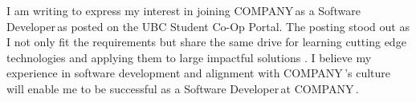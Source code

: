 \documentclass[11pt, a4paper]{awesome-cv}
\newcommand{\company}{COMPANY}
\newcommand{\companyName}{\company\,}
\newcommand{\postionName}{ Software Developer\,}
\begin{document}
\begin{cvletter}


\setlength\parindent{24pt} I am writing to express my interest in joining \companyName as a \postionName as posted on the UBC Student Co-Op Portal. The posting stood out as I not only fit the requirements but share the same drive for learning cutting edge technologies and applying them to large impactful solutions . I believe my experience in software development and alignment with \companyName's culture will enable me to be successful as a \postionName at \companyName.





\end{cvletter}
\end{document}
